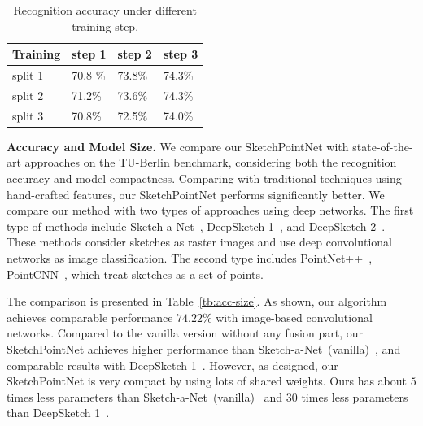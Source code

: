 \begin{table}[htbp]
\centering
\caption{Recognition accuracy under different training step.}
\label{tbl:iteration}
\begin{tabular}{l|lll}
    \hline
     Training& step 1&  step 2& step 3\\
    \hline
     split 1& 70.8 \% & 73.8\% & 74.3\% \\
     split 2& 71.2\% & 73.6\% & 74.3\% \\
     split 3& 70.8\% & 72.5\% & 74.0\% \\
    \hline
\end{tabular}
\end{table}



\noindent\textbf{Accuracy and Model Size.}
%
We compare our SketchPointNet with state-of-the-art approaches on the TU-Berlin benchmark, considering both the recognition accuracy and model compactness.
%
Comparing with traditional techniques using hand-crafted features, our SketchPointNet performs significantly better.
%
We compare our method with two types of approaches using deep networks.
The first type of methods include Sketch-a-Net~\cite{Yu2015SketchaNetTB}, DeepSketch 1~\cite{Seddati2015DeepSketchDC}, and DeepSketch 2~\cite{Dupont2016DeepSketch2D}.
These methods consider sketches as raster images and use deep convolutional networks as image classification.
The second type includes PointNet++~\cite{qi2017pointnetplusplus}, PointCNN~\cite{1801.07791}, which treat sketches as a set of points.


The comparison is presented in Table~\ref{tb:acc-size}.
As shown, our algorithm achieves comparable performance $74.22\%$ with image-based convolutional networks.
%
Compared to the vanilla version without any fusion part, our SketchPointNet achieves higher performance than Sketch-a-Net~(vanilla)~\cite{Yu2015SketchaNetTB}, and comparable results with DeepSketch 1~\cite{Seddati2015DeepSketchDC}.
However, as designed, our SketchPointNet is very compact by using lots of shared weights.
Ours has about $5$ times less parameters than Sketch-a-Net~(vanilla)~\cite{Yu2015SketchaNetTB} and $30$ times less parameters than DeepSketch 1~\cite{Seddati2015DeepSketchDC}.
%
%


